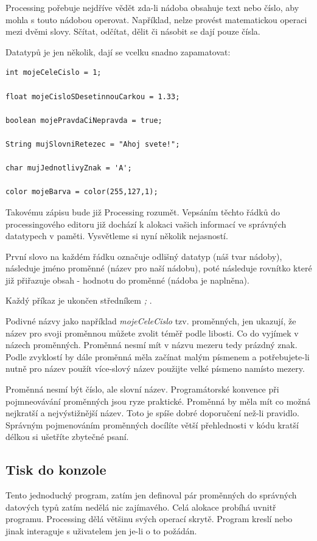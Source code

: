 \documentclass[11pt]{article}
\begin{document}
Processing pořebuje nejdříve vědět zda-li nádoba obsahuje text nebo číslo, aby mohla s touto nádobou operovat. Například, nelze provést matematickou operaci mezi dvěmi slovy. Sčítat, odčítat, dělit či násobit se dají pouze čísla.

Datatypů je jen několik, dají se vcelku snadno zapamatovat:

\begin{lstlisting}
int mojeCeleCislo = 1;

float mojeCisloSDesetinnouCarkou = 1.33;

boolean mojePravdaCiNepravda = true;

String mujSlovniRetezec = "Ahoj svete!";

char mujJednotlivyZnak = 'A';

color mojeBarva = color(255,127,1);
\end{lstlisting}

Takovému zápisu bude již Processing rozumět. Vepsáním těchto řádků do processingového editoru již dochází k alokaci vašich informací ve správných datatypech v paměti. Vysvětleme si nyní několik nejasností.

První slovo na každém řádku označuje odlišný datatyp (náš tvar nádoby), následuje jméno proměnné (název pro naší nádobu), poté následuje rovnítko které již přiřazuje obsah - hodnotu do proměnné (nádoba je naplněna).

Každý příkaz je ukončen středníkem {\em ;} .

Podivné názvy jako například {\em mojeCeleCislo} tzv. proměnných, jen ukazují, že název pro svoji proměnnou můžete zvolit téměř podle libosti. Co do vyjímek v názech proměnných. Proměnná nesmí mít v názvu mezeru tedy prázdný znak. Podle zvyklostí by dále proměnná měla začínat malým písmenem a potřebujete-li nutně pro název použít více-slový název použijte velké písmeno namísto mezery.

Proměnná nesmí být číslo, ale slovní název. Programátorské konvence při pojmneovávání proměnných jsou ryze praktické. Proměnná by měla mít co možná nejkratší a nejvýstižnější název.  Toto je spíše dobré doporučení než-li pravidlo. Správným pojmenováním proměnných docílíte větší přehlednosti v kódu kratší délkou si ušetříte zbytečné psaní.

\subsection{Tisk do konzole}

Tento jednoduchý program, zatím jen definoval pár proměnných do správných datových typů zatím nedělá nic zajímavého. Celá alokace probíhá uvnitř programu. Processing dělá většinu svých operací skrytě. Program kreslí nebo jinak interaguje s uživatelem jen je-li o to požádán.
\end{document}
